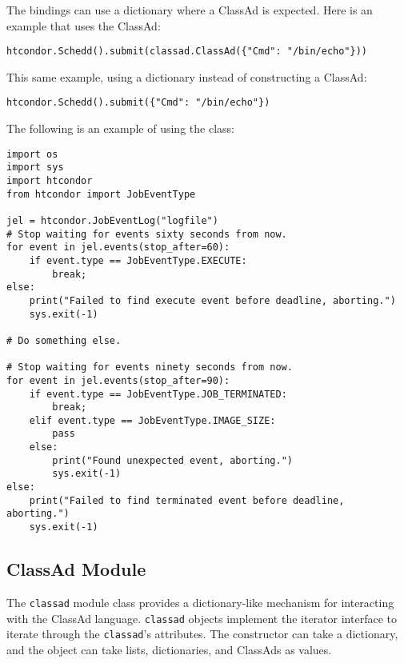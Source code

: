 The bindings can use a dictionary where a ClassAd is expected.
Here is an example that uses the ClassAd:
\footnotesize
\begin{verbatim}
htcondor.Schedd().submit(classad.ClassAd({"Cmd": "/bin/echo"}))
\end{verbatim}
\normalsize
This same example, using a dictionary instead of constructing a ClassAd:
\footnotesize
\begin{verbatim}
htcondor.Schedd().submit({"Cmd": "/bin/echo"})
\end{verbatim}
\normalsize

The following is an example of using the  class:

\footnotesize
\begin{verbatim}
import os
import sys
import htcondor
from htcondor import JobEventType

jel = htcondor.JobEventLog("logfile")
# Stop waiting for events sixty seconds from now.
for event in jel.events(stop_after=60):
    if event.type == JobEventType.EXECUTE:
        break;
else:
    print("Failed to find execute event before deadline, aborting.")
    sys.exit(-1)

# Do something else.

# Stop waiting for events ninety seconds from now.
for event in jel.events(stop_after=90):
    if event.type == JobEventType.JOB_TERMINATED:
        break;
    elif event.type == JobEventType.IMAGE_SIZE:
        pass
    else:
        print("Found unexpected event, aborting.")
        sys.exit(-1)
else:
    print("Failed to find terminated event before deadline, aborting.")
    sys.exit(-1)
\end{verbatim}
\normalsize


\subsection{\label{Python-ClassAd} ClassAd Module}

The \texttt{classad} module class provides a dictionary-like mechanism 
for interacting with the ClassAd language. 
\texttt{classad} objects implement the iterator interface to iterate 
through the \texttt{classad}'s attributes.
The constructor can take a dictionary,
and the object can take lists, dictionaries, and ClassAds as values.

